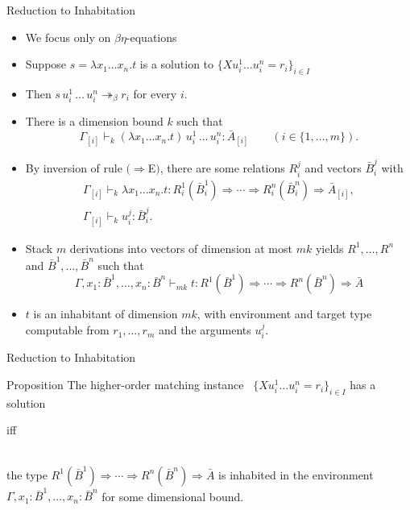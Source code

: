 \documentclass{beamer}
\renewcommand{\:}{\mbox{\,:\,}\xspace}
\begin{document}
  \begin{frame}{Reduction to Inhabitation}

    \begin{itemize}
    \item We focus only on $\beta\eta$-equations
    \item Suppose $s = \lambda x_1 \ldots x_n.t$ is a solution to $\{ Xu_i^1\ldots u_i^n = r_i \}_{i\in I}$
    \item Then $s\,u_i^1\,\ldots\,u_i^n \twoheadrightarrow_\beta r_i$ for every $i$.
    \item There is a dimension bound $k$ such that
      \begin{displaymath}
        \Gamma_{[i]} \vdash_k (\lambda x_1 \ldots x_n.t)\,u_i^1\,\ldots\,u_i^n : \bar{A}_{[i]} \qquad (i \in \{1, \ldots, m\}).
      \end{displaymath}
    \item By inversion of rule $(\Rightarrow$E$)$, there are some
      relations $R_i^j$ and vectors $\bar{B}_i^j$ with
      \begin{displaymath}
        \begin{array}{l}
          \Gamma_{[i]} \vdash_k \lambda x_1 \ldots x_n.t : R_i^1(\bar{B}_i^1) \Rightarrow \cdots \Rightarrow R_i^n(\bar{B}_i^n) \Rightarrow \bar{A}_{[i]},\\
          \Gamma_{[i]} \vdash_k u_i^j : \bar{B}_i^j.
        \end{array}
      \end{displaymath}
    \item Stack  $m$ derivations into vectors of dimension at most $mk$
      yields $R^1, \ldots, R^n$ and $\bar{B}^1, \ldots, \bar{B}^n$ such that
      \[
        \Gamma, x_1 : \bar{B}^1, \ldots, x_n : \bar{B}^n \vdash_{mk} t : R^1(\bar{B}^1) \Rightarrow \cdots \Rightarrow R^n(\bar{B}^n) \Rightarrow \bar{A}
      \]
    \item $t$ is an inhabitant of dimension $mk$, with environment and target type computable from $r_1, \ldots, r_m$ and the arguments $u_i^j$.
    \end{itemize}
    
  \end{frame}


  
  \begin{frame}{Reduction to Inhabitation}
    \begin{block}{Proposition}
      The higher-order matching instance~ $\{ Xu_i^1\ldots u_i^n = r_i \}_{i\in I}$ has a solution\\[1ex]
      \centerline{iff}

      ~\\[-2ex]
      the type $R^1(\bar{B}^1) \Rightarrow \cdots \Rightarrow R^n(\bar{B}^n) \Rightarrow \bar{A}$ is inhabited in the environment $\Gamma, x_1 : \bar{B}^1, \ldots, x_n : \bar{B}^n$ for some dimensional bound.
    \end{block}
  \end{frame}
\end{document}
